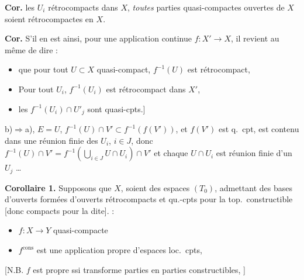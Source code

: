 \documentclass[11pt,a4paper]{article}
\begin{document}
\textbf{Cor.}     les $U_i$ rétrocompacts dans $X$,   \emph{toutes} parties quasi-compactes ouvertes de $X$ soient rétrocompactes en $X$.

\textbf{Cor.} S'il en est ainsi, pour une \struck{\ill{}} application continue $f:X'\to X$, il revient au même de \struck{\ill{}} dire :
\begin{itemize}
\item[(a)] que pour tout  $U\subset X$ quasi-compact, $f^{-1}(U)$ est rétrocompact,
\item[(b)] Pour tout $U_i$, $f^{-1}(U_i)$ est rétrocompact dans $X'$,
\item[(c)] [Si $X'$ a une base d'ouverts quasicompacts $U'_j$] les $f^{-1}(U_i)\cap U'_j$ sont  quasi-cpts.]
\end{itemize}


b)$\Rightarrow$a), $E=U$, $f^{-1}(U)\cap V'\subset f^{-1}(f(V'))$,  et $f(V')$ est q.\ cpt, est contenu dans une réunion finie des $U_i$, $i\in J$, donc $f^{-1}(U)\cap V'=f^{-1}(\bigcup_{i\in J} U\cap U_i)\cap V'$ et chaque $U\cap U_i$ est  réunion finie d'un $U_j$ \ldots
{}


\textbf{Corollaire 1.} Supposons que $X$,  \struck{\ill{} \ill{}} soient des espaces $(T_0)$,  admettant des bases d'ouverts formées d'ouverts  rétrocompacts et qu.-cpts pour la top.\ constructible [donc compacts pour la dite]. \struck{\ill{}}  :
\begin{itemize}
\item[a)] $f:X\to Y$   quasi-compacte
\item[b)] \struck{[$f$ \ill{} $X$]}  $f^{\mathrm{cons}}$ est une  application propre d'espaces loc.\ cpts, 
\end{itemize}
[N.B. $f$ est propre ssi transforme parties  en parties constructibles,   ]
\end{document}

